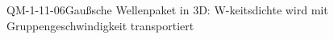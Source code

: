 
\begin{EXA}{QM-1-11-06}{Gaußsche Wellenpaket in 3D: W-keitsdichte wird mit Gruppengeschwindigkeit transportiert}
\end{EXA}
